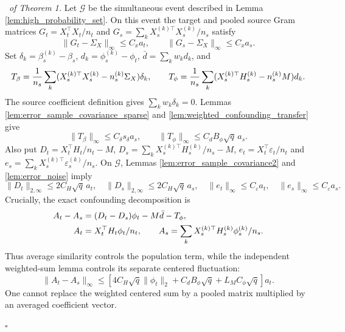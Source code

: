 \documentclass[12pt]{article}
\newenvironment{pf}{{\noindent \it Proof}\ }{\hfill $\square$\par}
\begin{document}
\begin{pf}{\it of Theorem 1.}
Let $\mathcal G$ be the simultaneous event described in Lemma
\ref{lem:high_probability_set}. On this event the target and pooled source
Gram matrices $G_t=X_t^\top X_t/n_t$ and
$G_s=\sum_kX_s^{(k)\top}X_s^{(k)}/n_s$ satisfy
\[
 \|G_t-\Sigma_X\|_\infty\le C_xa_t,\qquad
 \|G_s-\Sigma_X\|_\infty\le C_xa_s.
\]
Set $\delta_k=\beta_s^{(k)}-\beta_s$, $d_k=\phi_s^{(k)}-\phi_t$,
$\bar d=\sum_kw_kd_k$, and
\[
 T_\beta={1\over n_s}\sum_k
 (X_s^{(k)\top}X_s^{(k)}-n_s^{(k)}\Sigma_X)\delta_k,\qquad
 T_\phi={1\over n_s}\sum_k
 (X_s^{(k)\top}H_s^{(k)}-n_s^{(k)}M)d_k.
\]
The source coefficient definition gives $\sum_kw_k\delta_k=0$.
Lemmas \ref{lem:error_sample_covariance_sparse} and
\ref{lem:weighted_confounding_transfer} give
\[
 \|T_\beta\|_\infty\le C_\delta s_\delta a_s,\qquad
 \|T_\phi\|_\infty\le C_d B_\phi\sqrt q\,a_s.
\]
Also put $D_t=X_t^\top H_t/n_t-M$,
$D_s=\sum_kX_s^{(k)\top}H_s^{(k)}/n_s-M$,
$e_t=X_t^\top\varepsilon_t/n_t$ and
$e_s=\sum_kX_s^{(k)\top}\varepsilon_s^{(k)}/n_s$.
On $\mathcal G$, Lemmas \ref{lem:error_sample_covariance2} and
\ref{lem:error_noise} imply
\[
 \|D_t\|_{2,\infty}\le2C_H\sqrt q\,a_t,\quad
 \|D_s\|_{2,\infty}\le2C_H\sqrt q\,a_s,\quad
 \|e_t\|_\infty\le C_\varepsilon a_t,\quad
 \|e_s\|_\infty\le C_\varepsilon a_s.
\]
Crucially, the exact confounding decomposition is
\begin{align}
 A_t-A_s&=(D_t-D_s)\phi_t-M\bar d-T_\phi,
 \label{eq:correct_weighted_confounding_decomposition}\\
 A_t&=X_t^\top H_t\phi_t/n_t,\qquad
 A_s=\sum_kX_s^{(k)\top}H_s^{(k)}\phi_s^{(k)}/n_s.\notag
\end{align}
Thus average similarity controls the population term, while the independent
weighted-sum lemma controls its separate centered fluctuation:
\[
 \|A_t-A_s\|_\infty\le
 [4C_H\sqrt q\|\phi_t\|_2+C_dB_\phi\sqrt q+
 L_MC_\phi\sqrt q]a_t.
\]
One cannot replace the weighted centered sum by a pooled matrix multiplied
by an averaged coefficient vector.


\end{pf}
\end{document}
